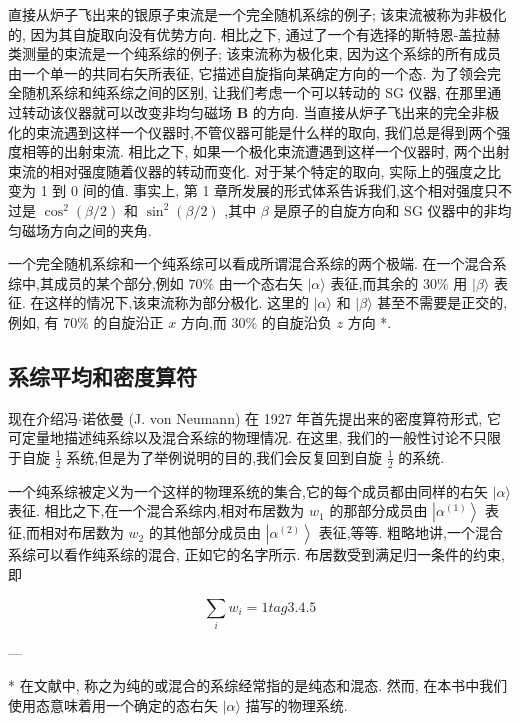 直接从炉子飞出来的银原子束流是一个完全随机系综的例子; 该束流被称为非极化的, 因为其自旋取向没有优势方向. 相比之下, 通过了一个有选择的斯特恩-盖拉赫类测量的束流是一个纯系综的例子; 该束流称为极化束, 因为这个系综的所有成员由一个单一的共同右矢所表征, 它描述自旋指向某确定方向的一个态. 为了领会完全随机系综和纯系综之间的区别, 让我们考虑一个可以转动的 SG 仪器, 在那里通过转动该仪器就可以改变非均匀磁场 $\mathbf{B}$ 的方向. 当直接从炉子飞出来的完全非极化的束流遇到这样一个仪器时,不管仪器可能是什么样的取向, 我们总是得到两个强度相等的出射束流. 相比之下, 如果一个极化束流遭遇到这样一个仪器时, 两个出射束流的相对强度随着仪器的转动而变化. 对于某个特定的取向, 实际上的强度之比变为 1 到 0 间的值. 事实上, 第 1 章所发展的形式体系告诉我们,这个相对强度只不过是 ${\cos }^{2}\left( {\beta /2}\right)$ 和 ${\sin }^{2}\left( {\beta /2}\right)$ ,其中 $\beta$ 是原子的自旋方向和 SG 仪器中的非均匀磁场方向之间的夹角.

一个完全随机系综和一个纯系综可以看成所谓混合系综的两个极端. 在一个混合系综中,其成员的某个部分,例如 ${70}\%$ 由一个态右矢 $|\alpha \rangle$ 表征,而其余的 ${30}\%$ 用 $|\beta \rangle$ 表征. 在这样的情况下,该束流称为部分极化. 这里的 $|\alpha \rangle$ 和 $|\beta \rangle$ 甚至不需要是正交的,例如, 有 ${70}\%$ 的自旋沿正 $x$ 方向,而 ${30}\%$ 的自旋沿负 $z$ 方向 *.

\subsection{系综平均和密度算符}

现在介绍冯$\cdot$诺依曼 (J. von Neumann) 在 1927 年首先提出来的密度算符形式, 它可定量地描述纯系综以及混合系综的物理情况. 在这里, 我们的一般性讨论不只限于自旋 $\frac{1}{2}$ 系统,但是为了举例说明的目的,我们会反复回到自旋 $\frac{1}{2}$ 的系统.

一个纯系综被定义为一个这样的物理系统的集合,它的每个成员都由同样的右矢 $|\alpha \rangle$ 表征. 相比之下,在一个混合系综内,相对布居数为 ${w}_{1}$ 的那部分成员由 $\left| {\alpha }^{\left( 1\right) }\right\rangle$ 表征,而相对布居数为 ${w}_{2}$ 的其他部分成员由 $\left| {\alpha }^{\left( 2\right) }\right\rangle$ 表征,等等. 粗略地讲,一个混合系综可以看作纯系综的混合, 正如它的名字所示. 布居数受到满足归一条件的约束, 即

$$
\mathop{\sum }\limits_{i}{w}_{i} = 1 tag{3. 4.5}
$$

---

* 在文献中, 称之为纯的或混合的系综经常指的是纯态和混态. 然而, 在本书中我们使用态意味着用一个确定的态右矢 $|\alpha \rangle$ 描写的物理系统.

